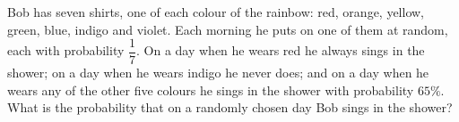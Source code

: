 Bob has seven shirts, one of each colour of the rainbow: red, orange, yellow, green, blue, indigo and violet. Each morning he puts on one of them at random, each with probability $\dfrac{1}{7}$. On a day when he wears red he always sings in the shower; on a day when he wears indigo he never does; and on a day when he wears any of the other five colours he sings in the shower with probability $65\%$. What is the probability that on a randomly chosen day Bob sings in the shower?
